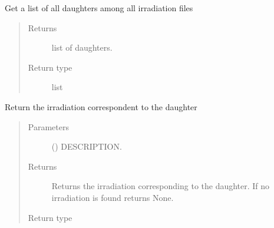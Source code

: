 \documentclass[letterpaper,10pt,english]{sphinxmanual}
\begin{document}
\begin{fulllineitems}
\begin{fulllineitems}
\end{fulllineitems}


\begin{fulllineitems}
\label{\detokenize{api/inputgeneration:parsersD1S.IrradiationFile.get_daughters}}
\sphinxAtStartPar
Get a list of all daughters among all irradiation files
\begin{quote}\begin{description}
\item[{Returns}] \leavevmode
\sphinxAtStartPar
list of daughters.

\item[{Return type}] \leavevmode
\sphinxAtStartPar
list

\end{description}\end{quote}

\end{fulllineitems}


\begin{fulllineitems}
\label{\detokenize{api/inputgeneration:parsersD1S.IrradiationFile.get_irrad}}
\sphinxAtStartPar
Return the irradiation correspondent to the daughter
\begin{quote}\begin{description}
\item[{Parameters}] \leavevmode
\sphinxAtStartPar
{} () \textendash{} DESCRIPTION.

\item[{Returns}] \leavevmode
\sphinxAtStartPar
Returns the irradiation corresponding to the daughter.
If no irradiation is found returns None.

\item[{Return type}] \leavevmode
\sphinxAtStartPar
{\hyperref[\detokenize{api/inputgeneration:parsersD1S.Irradiation}]{}}

\end{description}\end{quote}


\end{fulllineitems}
\end{fulllineitems}
\end{document}
